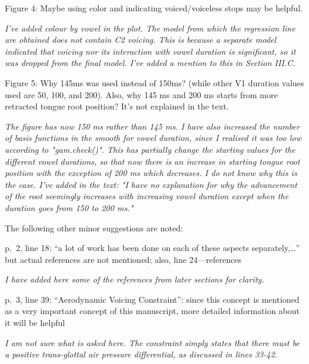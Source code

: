 \documentclass[]{article}
\begin{document}
Figure 4: Maybe using color and indicating voiced/voiceless stops may be
helpful.

\begin{adjustwidth}{1cm}{} \textit{
I've added colour by vowel in the plot. The model from which the regression line are obtained does not contain C2 voicing. This is because a separate model indicated that voicing nor its interaction with vowel duration is significant, so it was dropped from the final model. I've added a mention to this in Section III.C.
} \end{adjustwidth}

Figure 5: Why 145ms was used instead of 150ms? (while other V1 duration
values used are 50, 100, and 200). Also, why 145 ms and 200 ms starts
from more retracted tongue root position? It's not explained in the
text.

\begin{adjustwidth}{1cm}{} \textit{
The figure has now 150 ms rather than 145 ms. I have also increased the number of basis functions in the smooth for vowel duration, since I realised it was too low according to "gam.check()". This has partially change the starting values for the different vowel durations, so that now there is an increase in starting tongue root position with the exception of 200 ms which decreases. I do not know why this is the case. I've added in the text: "I have no explanation for why the advancement of the root seemingly increases with increasing vowel duration except when the duration goes from 150 to 200 ms."
} \end{adjustwidth}

The following other minor suggestions are noted:

p.~2, line 18: ``a lot of work has been done on each of these aspects
separately,\ldots{}'' but actual references are not mentioned; also,
line 24---references

\begin{adjustwidth}{1cm}{} \textit{
I have added here some of the references from later sections for clarity.
} \end{adjustwidth}

p.~3, line 39: ``Aerodynamic Voicing Constraint'': since this concept is
mentioned as a very important concept of this manuscript, more detailed
information about it will be helpful

\begin{adjustwidth}{1cm}{} \textit{
I am not sure what is asked here. The constraint simply states that there must be a positive trans-glottal air pressure differential, as discussed in lines 33-42.
} \end{adjustwidth}
\end{document}

